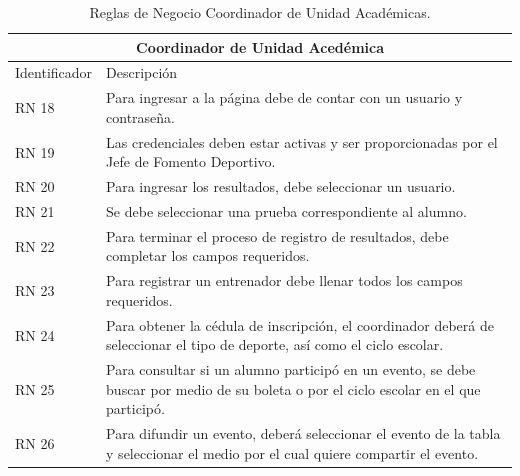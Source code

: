 	\begin{table}[hbt!]
		\begin{center}
			\begin{tabular}{|p{30mm}|p{100mm}|}
				\hline
				\multicolumn{2}{|c|}{Coordinador de Unidad Acedémica} \\
				\hline
				Identificador & Descripción \\
				\hline 
				RN 18 &  Para ingresar a la página debe de contar con un usuario y contraseña.\\ \hline
				RN 19 & Las credenciales deben estar activas y ser proporcionadas por el Jefe de Fomento Deportivo.\\ \hline
				RN 20 & Para ingresar los resultados, debe seleccionar un usuario. \\ \hline
				RN 21 & Se debe seleccionar una prueba correspondiente al alumno.\\ \hline
				RN 22 & Para terminar el proceso de registro de resultados, debe completar los campos requeridos. \\ \hline
				RN 23 & Para registrar un entrenador debe llenar todos los campos requeridos.\\ \hline
				RN 24 & Para obtener la cédula de inscripción, el coordinador deberá de seleccionar el tipo de deporte, así como el ciclo escolar. \\ \hline
				RN 25 & Para consultar si un alumno participó en un evento, se debe buscar por medio de su boleta o por el ciclo escolar en el que participó.\\ \hline
				RN 26 & Para difundir un evento, deberá seleccionar el evento de la tabla y seleccionar el medio por el cual quiere compartir el evento.\\ \hline
			\end{tabular}
			\caption{Reglas de Negocio Coordinador de Unidad Académicas.}
			\label{RNCUA}
		\end{center}
	\end{table}
	
	\pagebreak
	

